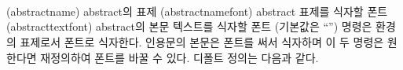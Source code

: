 \begin{syntax}
\cmd{\abstractname} \\
\cmd{\abstractnamefont} \\
\cmd{\abstracttextfont} \\
\end{syntax}
\glossary(abstractname)%
  {}%
  {abstract의 표제}
\glossary(abstractnamefont)%
  {}%
  {abstract 표제를 식자할 폰트}
\glossary(abstracttextfont)%
  {}%
  {abstract의 본문 텍스트를 식자할 폰트}
\cmd{\abstractname} (기본값은 “\abstractname”) 명령은  환경의
표제로서 \cmd{\abstractnamefont} 폰트로 식자한다.
인용문의 본문은 \cmd{\abstracttextfont} 폰트를 써서 식자하며 이 두 명령은 원한다면 재정의하여 폰트를 바꿀 수 있다.
디폴트 정의는 다음과 같다.
\begin{lcode}
\newcommand{\abstractnamefont}{\normalfont\small\bfseries}
\newcommand{\abstracttextfont}{\normalfont\small}
\end{lcode}

